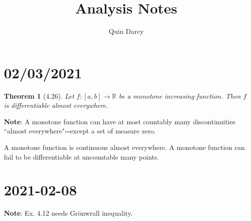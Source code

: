 \documentclass[12pt]{article}
\newtheorem{theorem}{Theorem}[section]
\theoremstyle{definition}
\theoremstyle{definition}
\begin{document}
\title{Analysis Notes}
\author{Quin Darcy}
\maketitle
    \section{02/03/2021}
    \begin{theorem}[4.26]
            Let $f:[a, b]\to \mathbb{R}$ be a monotone increasing
            function. Then $f$ is differentiable almost everywhere.
        \end{theorem}
        \textbf{Note}: A monotone function can have at most countably many
        discontinuities ``almost everywhere"=except a set of measure zero.\par
        A monotone function is continuous almost everywhere. A monotone
        function can fail to be differentiable at uncountable many points.
        \section{2021-02-08}
        \textbf{Note}: Ex. 4.12 needs Gr\"onwrall inequality.\par\hspace{4mm}
\end{document}
